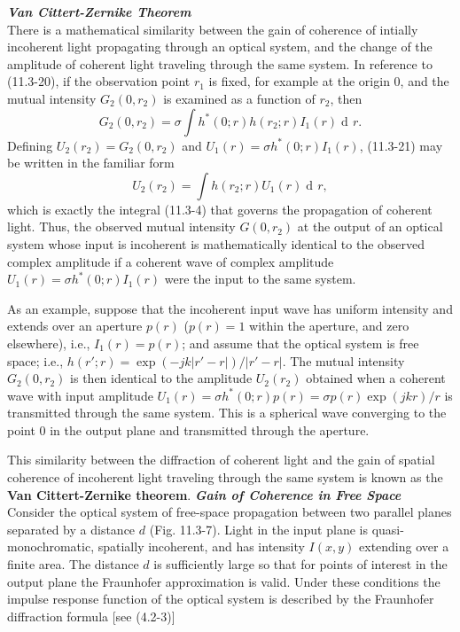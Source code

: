 \documentclass{article}
\numberwithin{figure}{subsection}
\numberwithin{table}{subsection}
\DeclareMathOperator\dif{d\!}
\begin{document}
\bigbreak\noindent\textcolor{ksc}{\textbf{\textsl{Van Cittert-Zernike Theorem}}}\\
There is a mathematical similarity between the gain of coherence of intially incoherent light propagating through an optical system, and the change of the amplitude of coherent light traveling through the same system. In reference to (11.3-20), if the observation point $r_1$ is fixed, for example at the origin 0, and the mutual intensity $G_2 (0, r_2)$ is examined as a function of $r_2$, then
\begin{equation}
G_2(0, r_2) = \sigma \int h^\ast (0; r) h(r_2; r) I_1 (r) \dif r .
\end{equation}
Defining $U_2 (r_2) = G_2 (0, r_2)$ and $U_1 (r) = \sigma h^\ast (0; r) I_1 (r)$, (11.3-21) may be written in the familiar  form
\begin{equation}
U_2(r_2) = \int h(r_2; r) U_1 (r) \dif r ,
\end{equation}
which is exactly the integral (11.3-4) that governs the propagation of coherent light. Thus, the observed mutual intensity $G(0, r_2)$ at the output of an optical system whose input is incoherent is mathematically identical to the observed complex amplitude if a coherent wave of complex amplitude $U_1 (r) = \sigma h^\ast (0; r) I_1 (r)$ were the input to the same system.
\par As an example, suppose that the incoherent input wave has uniform intensity and extends over an aperture $p(r)$ ($p(r) = 1$ within the aperture, and zero elsewhere),  i.e., $I_1 (r) = p(r)$; and assume that the optical system is free space; i.e., $h(r'; r) = \exp (-jk\lvert r' - r \rvert) / \lvert r' - r \rvert$. The mutual intensity $G_2 (0, r_2)$ is then identical to the amplitude $U_2 (r_2)$ obtained when a coherent wave with input amplitude $U_1 (r) = \sigma h^\ast (0; r) p(r) = \sigma p(r) \exp (jkr) / r$ is transmitted through the same system. This is a spherical wave converging to the point 0 in the output plane and transmitted through the aperture.
\par This similarity between the diffraction of coherent light and the gain of spatial coherence of incoherent light traveling through the same system is known as the \textbf{Van Cittert-Zernike theorem}.
\bigbreak\noindent\textcolor{ksc}{\textbf{\textsl{Gain of Coherence in Free Space}}}\\
Consider the optical system of free-space propagation between two parallel planes separated by a distance $d$ (Fig. 11.3-7). Light in the input plane is quasi-monochromatic, spatially incoherent, and has intensity $I(x,y)$ extending over a finite area. The distance $d$ is sufficiently large so that for points of interest in the output plane the Fraunhofer approximation is valid. Under these conditions the impulse response function of the optical system is described by the Fraunhofer diffraction formula [see (4.2-3)]
\end{document}
